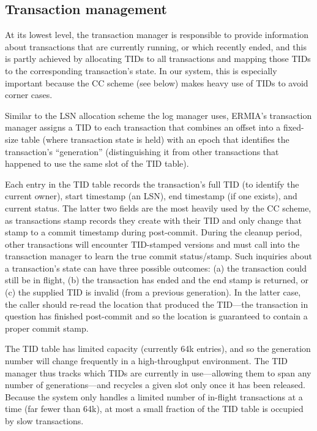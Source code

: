 \subsection{Transaction management}
At its lowest level, the transaction manager is responsible to provide information about transactions that are currently running, or which recently ended, and this is partly achieved by allocating TIDs to all transactions and mapping those TIDs to the corresponding transaction's state. In our system, this is especially important because the CC scheme (see below) makes heavy use of TIDs to avoid corner cases.

Similar to the LSN allocation scheme the log manager uses, ERMIA's transaction manager assigns a TID to each transaction that combines an offset into a fixed-size table (where transaction state is held) with an epoch that identifies the transaction's ``generation'' (distinguishing it from other transactions that happened to use the same slot of the TID table).

Each entry in the TID table records the transaction's full TID (to identify the current owner), start timestamp (an LSN), end timestamp (if one exists), and current status. The latter two fields are the most heavily used by the CC scheme, as transactions stamp records they create with their TID and only change that stamp to a commit timestamp during post-commit. During the cleanup period, other transactions will encounter TID-stamped versions and must call into the transaction manager to learn the true commit status/stamp. Such inquiries about a transaction's state can have three possible outcomes: (a) the transaction could still be in flight, (b) the transaction has ended and the end stamp is returned, or (c) the supplied TID is invalid (from a previous generation). In the latter case, the caller should re-read the location that produced the TID---the transaction in question has finished post-commit and so the location is guaranteed to contain a proper commit stamp.

The TID table has limited capacity (currently 64k entries), and so the generation number will change frequently in a high-throughput environment. The TID manager thus tracks which TIDs are currently in use---allowing them to span any number of generations---and recycles a given slot only once it has been released. Because the system only handles a limited number of in-flight transactions at a time (far fewer than 64k), at most a small fraction of the TID table is occupied by slow transactions. 


